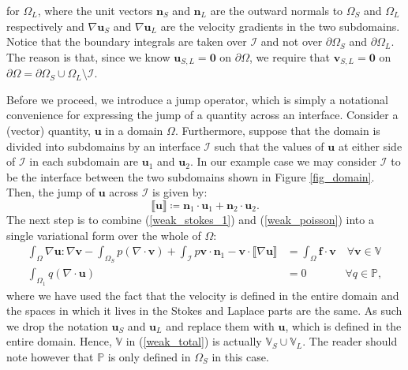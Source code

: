 \documentclass[12pt,a4paper]{article}
\theoremstyle{definition}
\begin{document}
for $\Omega_L$, where the unit vectors $\textbf{n}_S$ and $\textbf{n}_L$ are the outward normals to $\Omega_{S}$ and $\Omega_{L}$ respectively and $\nabla \textbf{u}_S$ and $\nabla \textbf{u}_L$ are the velocity gradients in the two subdomains. Notice that the boundary integrals are taken over $\mathcal{I}$ and not over $\partial \Omega_{S}$ and $\partial \Omega_{L}$.  The reason is that, since we know $\textbf{u}_{S,L}=\textbf{0}$ on $\partial \Omega$, we require that $\textbf{v}_{S,L}=\textbf{0}$ on $ \partial \Omega = \partial \Omega_S\cup \Omega_{L}\setminus \mathcal{I}$.   

Before we proceed, we introduce a jump operator, which is simply a notational convenience for expressing the jump of a quantity across an interface.  Consider a (vector) quantity, $\textbf{u}$ in a domain $\Omega$.   Furthermore, suppose that the domain is divided into subdomains by an interface $\mathcal{I}$ such that the values of $\textbf{u}$ at either side of $\mathcal{I}$ in each subdomain are $\textbf{u}_1$ and $\textbf{u}_2$. In our example case we may consider $\mathcal{I}$ to be the interface between the two subdomains shown in Figure \ref{fig_domain}.  Then, the jump of $\textbf{u}$ across $\mathcal{I}$ is given by:
\begin{equation}
\llbracket \textbf{u} \rrbracket \coloneqq \textbf{n}_1\cdot \textbf{u}_1+\textbf{n}_2\cdot  \textbf{u}_2.
\end{equation}
The next step is to combine (\ref{weak_stokes_1}) and (\ref{weak_poisson}) into a single variational form over the whole of $\Omega$:
\begin{equation}\label{weak_total}
\begin{aligned}
\int_{\Omega}\nabla \textbf{u} : \nabla \textbf{v}-\int_{\Omega_S}p\left(\nabla \cdot \textbf{v}\right) +\int_{\mathcal{I}} p\textbf{v}\cdot \textbf{n}_1-\textbf{v}\cdot\llbracket\nabla\textbf{u}\rrbracket &=\int_{\Omega}\textbf{f}\cdot \textbf{v} \quad \forall  \textbf{v}\in \mathbb{V}\\
\int_{\Omega_1}q\left(\nabla \cdot \textbf{u}\right) &= 0\quad\quad\,\,\,\quad \forall q\in \mathbb{P},
\end{aligned}
\end{equation}
where we have used the fact that the velocity is defined in the entire domain and the spaces in which it lives in the Stokes and Laplace parts are the same.  As such we drop the notation $\textbf{u}_S$ and $\textbf{u}_L$ and replace them with $\textbf{u}$, which is defined in the entire domain.  Hence, $\mathbb{V}$ in (\ref{weak_total}) is actually $\mathbb{V}_S\cup\mathbb{V}_L$.  The reader should note however that $\mathbb{P}$ is only defined in $\Omega_S$ in this case.
\end{document}
